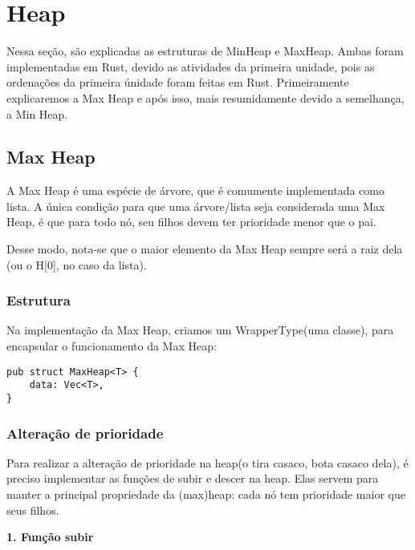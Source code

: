 \section{Heap}

Nessa seção, são explicadas as estruturas de MinHeap e MaxHeap. Ambas foram implementadas em
Rust, devido as atividades da primeira unidade, pois as ordenações da primeira únidade foram feitas
em Rust. Primeiramente explicaremos a Max Heap e após isso, mais resumidamente devido a semelhança, 
a Min Heap.

\subsection{Max Heap}

A Max Heap é uma espécie de árvore, que é comumente implementada como lista. A única 
condição para que uma árvore/lista seja considerada uma Max Heap, é que para todo nó, 
seu filhos devem ter prioridade menor que o pai.

Desse modo, nota-se que o maior elemento da Max Heap sempre será a raiz dela
(ou o H[0], no caso da lista).

\subsubsection{Estrutura}

Na implementação da Max Heap, criamos um WrapperType(uma classe), para encapsular o
funcionamento da Max Heap:

\vspace{3mm}

\begin{lstlisting}
pub struct MaxHeap<T> {
    data: Vec<T>,
}
\end{lstlisting}

\vspace{3mm}

\subsubsection{Alteração de prioridade}

Para realizar a alteração de prioridade na heap(o tira casaco, bota casaco dela),
é preciso implementar as funções de subir e descer na heap. Elas servem para manter a
principal propriedade da (max)heap: cada nó tem prioridade maior que seus filhos.

\vspace{3mm}

\textbf{1. Função subir} 

